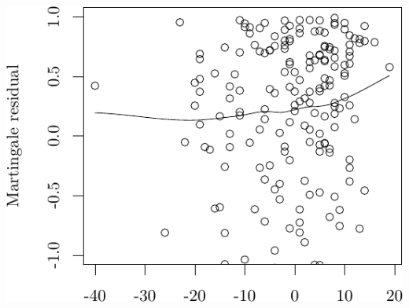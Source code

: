 \documentclass{article}
\begin{document}
\begin{knitrout}
{\centering \includegraphics[width=\maxwidth]{figure/05-eda-func-form-age-2} 

}



\end{knitrout}
\end{document}

